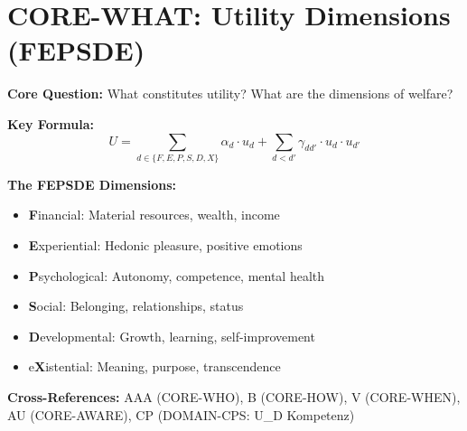 
\chapter{CORE-WHAT: Utility Dimensions (FEPSDE)}
\label{app:core-what}

\begin{abstract}
This appendix answers the second fundamental question of the Evidence-Based Framework:
\textit{``What constitutes utility?''} Standard economics reduces utility to a single
dimension (typically money or consumption). We establish that human welfare comprises
six irreducible dimensions: Financial (F), Experiential (E), Psychological (P),
Social (S), Developmental (D), and Existential (X) --- the FEPSDE taxonomy.
The axiom system DIM-1 through DIM-12 formalizes these dimensions, their properties,
and measurement approaches.
\end{abstract}


\begin{tcolorbox}[colback=blue!5!white, colframe=blue!75!black,
    title=Quick Reference: CORE-WHAT]

\textbf{Core Question:} What constitutes utility? What are the dimensions of welfare?

\textbf{Key Formula:}
\begin{equation}
U = \sum_{d \in \{F,E,P,S,D,X\}} \alpha_d \cdot u_d + \sum_{d < d'} \gamma_{dd'} \cdot u_d \cdot u_{d'}
\label{eq:what-utility}
\end{equation}

\textbf{The FEPSDE Dimensions:}
\begin{itemize}[nosep]
\item \textbf{F}inancial: Material resources, wealth, income
\item \textbf{E}xperiential: Hedonic pleasure, positive emotions
\item \textbf{P}sychological: Autonomy, competence, mental health
\item \textbf{S}ocial: Belonging, relationships, status
\item \textbf{D}evelopmental: Growth, learning, self-improvement
\item e\textbf{X}istential: Meaning, purpose, transcendence
\end{itemize}

\textbf{Cross-References:}
AAA (CORE-WHO), B (CORE-HOW), V (CORE-WHEN), AU (CORE-AWARE), CP (DOMAIN-CPS: U\_D Kompetenz)

\end{tcolorbox}


